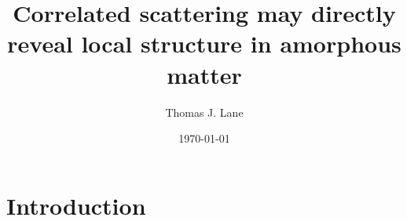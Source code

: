 \documentclass[aps,prl,preprint,groupedaddress]{revtex4-1}
\begin{document}

\title{Correlated scattering may directly reveal local structure in amorphous matter}


\author{Thomas J. Lane}
\affiliation{}


\date{\today}

\begin{abstract}
\end{abstract}

\pacs{}

\maketitle


\section{Introduction}
 
\end{document}
